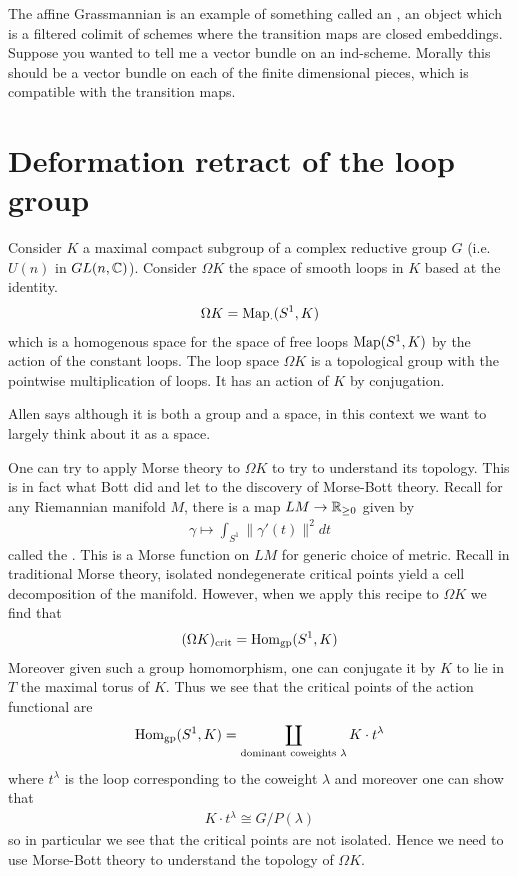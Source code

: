 \documentclass[12pt]{article}
\begin{document}
\begin{remark}
    The affine Grassmannian is an example of something called an ,
    an object which is a filtered colimit of schemes where the 
    transition maps are closed embeddings. Suppose you wanted to tell me
    a vector bundle on an ind-scheme. Morally this should be a vector
    bundle on each of the finite dimensional pieces, which is compatible
    with the transition maps. 
\end{remark}

\section{Deformation retract of the loop group}
Consider $K$ a maximal compact subgroup of a complex reductive group $G$ (i.e. $U(n)$ in $GL(n,\mathbb{C})$).
Consider $\Omega K$ the space of smooth loops in $K$ based at the identity. \begin{align}
    \Omega K = \operatorname{Map}_{\cdot}(S^1,K)
\end{align} which is a homogenous space for the space of free loops $\operatorname{Map}(S^1,K)$ by the action of
the constant loops. The loop space $\Omega K$ is a topological group with the pointwise multiplication
of loops. It has an action of $K$ by conjugation.

\begin{remark}
    Allen says although it is both a group and a space, in this context we want to largely
    think about it as a space.
\end{remark}

One can try to apply Morse theory to $\Omega K$ to try to understand its topology. This is 
in fact what Bott did and let to the discovery of Morse-Bott theory. Recall for any 
Riemannian manifold $M$, there is a map $LM \to \mathbb{R}_{\geq 0}$ given by \begin{align}
    \gamma \mapsto \int_{S^1} \|\gamma'(t)\|^2 dt
\end{align} called the . This is a Morse function on $LM$ for generic
choice of metric. Recall in traditional Morse theory, isolated nondegenerate critical points
yield a cell decomposition of the manifold. However, when we apply this recipe to $\Omega K$ 
we find that \begin{align}
    (\Omega K)_{\text{crit}} = \operatorname{Hom}_{\text{gp}}(S^1,K)
\end{align} Moreover given such a group homomorphism, one can conjugate it by $K$ to lie in $T$
the maximal torus of $K$. Thus we see that the critical points of the action functional are
\begin{align*}
    \operatorname{Hom}_{\text{gp}}(S^1,K) = \coprod_{\text{dominant coweights $\lambda$}} K \cdot t^\lambda
\end{align*} where $t^\lambda$ is the loop corresponding to the coweight $\lambda$ and 
moreover one can show that \begin{align*}
    K \cdot t^\lambda \cong G/P(\lambda)
\end{align*} so in particular we see that the critical points are not isolated.
Hence we need to use Morse-Bott theory to understand the topology of $\Omega K$.
\end{document}
